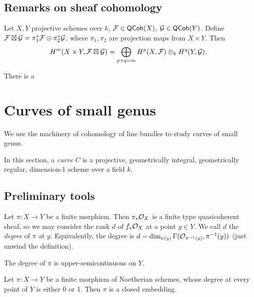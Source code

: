 \documentclass[11pt]{amsart}
\begin{document}
\subsection{Remarks on sheaf cohomology}

\begin{thm}
    Let $X,Y$ projective schemes over $k$, $\mathcal{F}\in \mathsf{QCoh}(X)$, $\mathcal{G}\in \mathsf{QCoh}(Y)$. Define $\mathcal{F}\boxtimes \mathcal{G} = \pi_1^\ast \mathcal{F}\otimes \pi_2^\ast \mathcal{G}$, where $\pi_1,\pi_2$ are projection maps from $X\times Y$. Then
    \[H^m(X\times Y, \mathcal{F}\boxtimes \mathcal{G}) = \bigoplus_{p+q=m} H^p(X, \mathcal{F})\otimes_k H^q(Y, \mathcal{G}).\]
\end{thm}

\begin{thm}
    There is a 
\end{thm}




\section{Curves of small genus}

We use the machinery of cohomology of line bundles to study curves of small genus. 

\begin{defn}
In this section, a \emph{curve} $C$ is a projective, geometrically integral, geometrically regular, dimension-1 scheme over a field $k$.
\end{defn}


\subsection{Preliminary tools}

\begin{defn}
Let $\pi:X\to Y$ be a finite morphism. Then $\pi_\ast \mathcal{O}_X$ is a finite type quasicoherent sheaf, so we may consider the rank $d$ of $f_\ast\mathcal{O}_X$ at a point $y\in Y$. We call $d$ the \emph{degree} of $\pi$ at $y$. Equivalently, the degree is $d = \dim_{\kappa(y)} \Gamma(\mathcal{O}_{\pi^{-1}(y)}, \pi^{-1}(y))$ (just unwind the definition).
\end{defn}

\begin{Rem}
The degree of $\pi$ is upper-semicontinuous on $Y$.
\end{Rem}

\begin{lem}
Let $\pi:X\to Y$ be a finite morphism of Noetherian schemes, whose degree at every point of $Y$ is either 0 or 1. Then $\pi$ is a closed embedding.
\end{lem}
\end{document}
